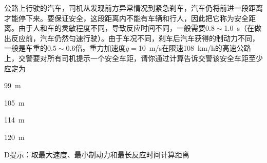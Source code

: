 公路上行驶的汽车，司机从发现前方异常情况到紧急刹车，汽车仍将前进一段距离才能停下来。要保证安全，这段距离内不能有车辆和行人，因此把它称为安全距离。由于人和车的灵敏程度不同，导致反应时间不同，一般需要\(0.8\sim\)\qty{1.0}{s}（在做出反应前，汽车仍然匀速行驶）。由于车况不同，刹车后汽车获得的制动力不同，一般是车重的\(0.5\sim0.6\)倍。重力加速度\(g =\)\qty{10}{m/s}在限速\qty{108}{km/h}的高速公路上，交警要对所有司机提示一个安全车距，请你通过计算告诉交警该安全车距至少应定为\paren[D]
\begin{choices}
	\item \qty{99}{m}
	\item \qty{105}{m}
	\item \qty{114}{m}
	\item \qty{120}{m}
\end{choices}
\begin{answer}
	D\qquad 提示：取最大速度、最小制动力和最长反应时间计算距离
\end{answer}